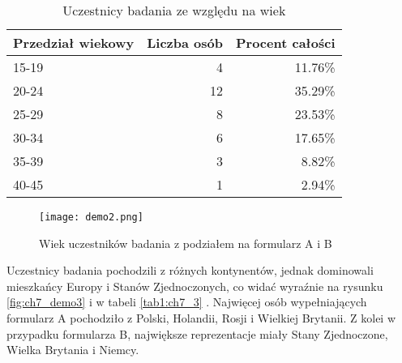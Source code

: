 \begin{table}[h!]
    \begin{center}
        \begin{tabular}{|l|r|r|}
            \hline
            Przedział wiekowy & Liczba osób & Procent całości \\
            \hline
            15-19             & 4           & 11.76\%         \\
            20-24             & 12          & 35.29\%         \\
            25-29             & 8           & 23.53\%         \\
            30-34             & 6           & 17.65\%         \\
            35-39             & 3           & 8.82\%          \\
            40-45             & 1           & 2.94\%          \\
            \hline
        \end{tabular}
    \end{center}
    \caption{Uczestnicy badania ze względu na wiek}\label{tab1:ch7_2}
\end{table}

\begin{figure}[h!]
    \centering
    \texttt{[image: demo2.png]}
    \caption{Wiek uczestników badania z podziałem na formularz A i B}
    \label{fig:ch7_demo2}
\end{figure}

Uczestnicy badania pochodzili z różnych kontynentów, jednak dominowali mieszkańcy Europy i Stanów
Zjednoczonych, co widać wyraźnie na rysunku \ref{fig:ch7_demo3} i w tabeli \ref{tab1:ch7_3} . Najwięcej
osób wypełniających formularz A pochodziło z Polski, Holandii, Rosji i Wielkiej Brytanii. Z kolei w
przypadku formularza B, największe reprezentacje miały Stany Zjednoczone, Wielka Brytania i Niemcy.

